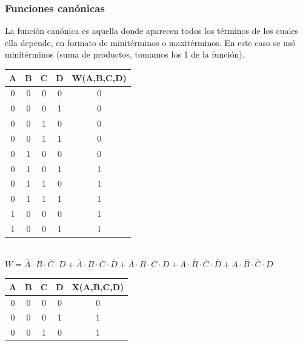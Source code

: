 \subsubsection{Funciones canónicas}
\sangria{} La función canónica es aquella donde aparecen todos los términos de los cuales ella depende, en formato de minitérminos o maxitérminos. En este caso se usó minitérminos (suma de productos, tomamos los 1 de la función).

\begin{center}
\begin{minipage}{0.45\textwidth}\centering
\begin{tabular}{cccc|c}
\rowcolor[HTML]{FFFC9E} 
A & B & C & D & \cellcolor[HTML]{FFCCC9}W(A,B,C,D) \\ \hline
0 & 0 & 0 & 0 & 0                                  \\
0 & 0 & 0 & 1 & 0                                  \\
0 & 0 & 1 & 0 & 0                                  \\
0 & 0 & 1 & 1 & 0                                  \\
0 & 1 & 0 & 0 & 0                                  \\
0 & 1 & 0 & 1 & 1                                  \\
0 & 1 & 1 & 0 & 1                                  \\
0 & 1 & 1 & 1 & 1                                  \\
1 & 0 & 0 & 0 & 1                                  \\
1 & 0 & 0 & 1 & 1                                 
\end{tabular}\\[10pt]
$W = \overline{A}\cdot{}B\cdot{}\overline{C}\cdot{}D + \overline{A}\cdot{}B\cdot{}C\cdot\overline{D} + \overline{A}\cdot{}B\cdot{}C\cdot{}D + A\cdot\overline{B}\cdot\overline{C}\cdot\overline{D} + A\cdot\overline{B}\cdot\overline{C}\cdot{}D$
\end{minipage}
\hfill
\begin{minipage}{0.45\textwidth}\centering
\begin{tabular}{cccc|c}
\rowcolor[HTML]{FFFC9E} 
A & B & C & D & \cellcolor[HTML]{FFCCC9}X(A,B,C,D) \\ \hline
0 & 0 & 0 & 0 & 0                                  \\
0 & 0 & 0 & 1 & 1                                  \\
0 & 0 & 1 & 0 & 1                                  \\

\end{tabular}
\end{minipage}
\end{center}
